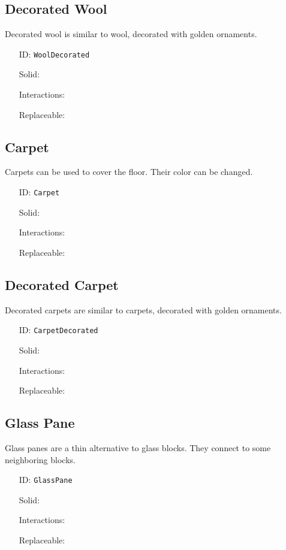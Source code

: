 \subsection{Decorated Wool}\label{subsec:blocks_decorated wool}
Decorated wool is similar to wool, decorated with golden ornaments.
\newline
\begin{itemize}[nosep]
    \item[ID:] \texttt{WoolDecorated}
    \item[Solid:]  \Checkmark \item[Interactions:]  \Checkmark \item[Replaceable:]  \XSolidBrush
\end{itemize}

\subsection{Carpet}\label{subsec:blocks_carpet}
Carpets can be used to cover the floor. Their color can be changed.
\newline
\begin{itemize}[nosep]
    \item[ID:] \texttt{Carpet}
    \item[Solid:]  \Checkmark \item[Interactions:]  \Checkmark \item[Replaceable:]  \XSolidBrush
\end{itemize}

\subsection{Decorated Carpet}\label{subsec:blocks_decorated carpet}
Decorated carpets are similar to carpets, decorated with golden ornaments.
\newline
\begin{itemize}[nosep]
    \item[ID:] \texttt{CarpetDecorated}
    \item[Solid:]  \Checkmark \item[Interactions:]  \Checkmark \item[Replaceable:]  \XSolidBrush
\end{itemize}

\subsection{Glass Pane}\label{subsec:blocks_glass pane}
Glass panes are a thin alternative to glass blocks.
They connect to some neighboring blocks.
\newline
\begin{itemize}[nosep]
    \item[ID:] \texttt{GlassPane}
    \item[Solid:]  \Checkmark \item[Interactions:]  \XSolidBrush \item[Replaceable:]  \XSolidBrush
\end{itemize}

